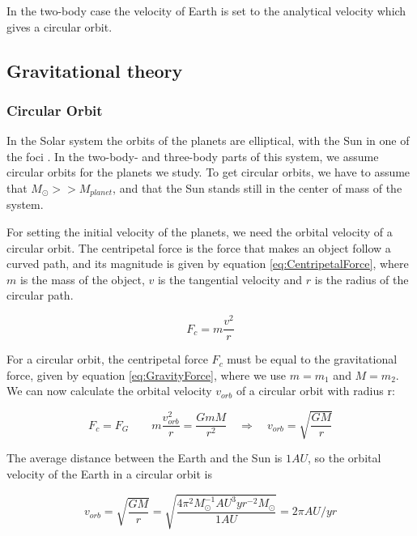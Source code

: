 \documentclass[norsk,a4paper,12pt]{article}
\begin{document}
In the two-body case the velocity of Earth is set to the analytical velocity which gives a circular orbit. 
 
\subsection{Gravitational theory}
\subsubsection{Circular Orbit}
In the Solar system the orbits of the planets are elliptical, with the Sun in one of the foci \cite{kepler}. In the two-body- and three-body parts of this system, we assume circular orbits for the planets we study. To get circular orbits, we have to assume that $M_{\odot} >> M_{planet}$, and that the Sun stands still in the center of mass of the system. \par
\vspace{3mm}

For setting the initial velocity of the planets, we need the orbital velocity of a circular orbit. The centripetal force is the force that makes an object follow a curved path, and its magnitude is given by equation \ref{eq:CentripetalForce}, where $m$ is the mass of the object, $v$ is the tangential velocity and $r$ is the radius of the circular path. 

\begin{equation}
     F_c = m \frac{v^2}{r}
     \label{eq:CentripetalForce}
\end{equation}

For a circular orbit, the centripetal force $F_c$ must be equal to the gravitational force, given by equation \ref{eq:GravityForce}, where we use $m = m_1$ and $M =m_2$. We can now calculate the orbital velocity $v_{orb}$ of a circular orbit with radius r:

\begin{equation}
    F_c = F_G \quad \quad m \frac{v_{orb}^2}{r} = \frac{GmM}{r^2} \quad \Rightarrow \quad v_{orb} = \sqrt{\frac{GM}{r}}
    \label{eq:OrbitalVelocity}
\end{equation}

The average distance between the Earth and the Sun is $1 AU$, so the orbital velocity of the Earth in a circular orbit is

\begin{equation}
v_{orb} = \sqrt{\frac{GM}{r}} = \sqrt{\frac{ 4\pi^2 M_{\odot} ^{-1} AU^3 yr^{-2} M_{\odot}}{1 AU}} = 2\pi AU/yr 
\label{eq:AnalyticVel}
\end{equation}
\end{document}
